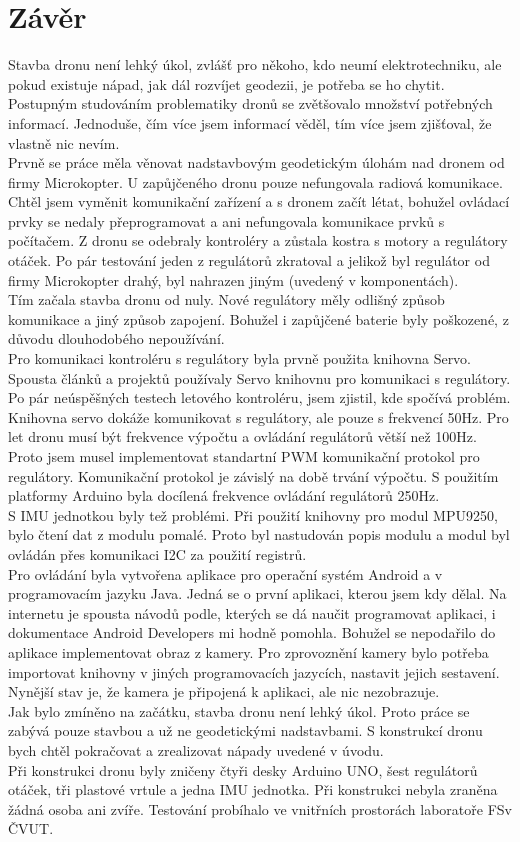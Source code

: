 \chapter{Závěr}
\label{8-zaver}
Stavba dronu není lehký úkol, zvlášť pro někoho, kdo neumí elektrotechniku, ale pokud existuje nápad, jak dál rozvíjet geodezii, je potřeba se ho chytit. Postupným studováním problematiky dronů se zvětšovalo množství potřebných informací. Jednoduše, čím více jsem informací věděl, tím více jsem zjišťoval, že vlastně nic nevím.\\
Prvně se práce měla věnovat nadstavbovým geodetickým úlohám nad dronem od firmy Microkopter. U zapůjčeného dronu pouze nefungovala radiová komunikace. Chtěl jsem vyměnit komunikační zařízení a s dronem začít létat, bohužel ovládací prvky se nedaly přeprogramovat a ani nefungovala komunikace prvků s počítačem. Z dronu se odebraly kontroléry a zůstala kostra s motory a regulátory otáček. Po pár testování jeden z regulátorů zkratoval a jelikož byl regulátor od firmy Microkopter drahý, byl nahrazen jiným (uvedený v komponentách).\\
Tím začala stavba dronu od nuly. Nové regulátory měly odlišný způsob komunikace a jiný způsob zapojení. Bohužel i zapůjčené baterie byly poškozené, z důvodu dlouhodobého nepoužívání.\\
Pro komunikaci kontroléru s regulátory byla prvně použita knihovna Servo. Spousta článků a projektů používaly Servo knihovnu pro komunikaci s regulátory. Po pár neúspěšných testech letového kontroléru, jsem zjistil, kde spočívá problém. Knihovna servo dokáže komunikovat s regulátory, ale pouze s frekvencí 50Hz. Pro let dronu musí být frekvence výpočtu a ovládání regulátorů větší než 100Hz. Proto jsem musel implementovat standartní PWM komunikační protokol pro regulátory. Komunikační protokol je závislý na době trvání výpočtu. S použitím platformy Arduino byla docílená frekvence ovládání regulátorů 250Hz.\\
S IMU jednotkou byly tež problémi. Při použití knihovny pro modul MPU9250, bylo čtení dat z modulu pomalé. Proto byl nastudován popis modulu a modul byl ovládán přes komunikaci I2C za použití registrů.\\
Pro ovládání byla vytvořena aplikace pro operační systém Android a v programovacím jazyku Java. Jedná se o první aplikaci, kterou jsem kdy dělal. Na internetu je spousta návodů podle, kterých se dá naučit programovat aplikaci, i dokumentace Android Developers mi hodně pomohla. Bohužel se nepodařilo do aplikace implementovat obraz z kamery. Pro zprovoznění kamery bylo potřeba importovat knihovny v jiných programovacích jazycích, nastavit jejich sestavení. Nynější stav je, že kamera je připojená k aplikaci, ale nic nezobrazuje.\\
Jak bylo zmíněno na začátku, stavba dronu není lehký úkol. Proto práce se zabývá pouze stavbou a už ne geodetickými nadstavbami. S konstrukcí dronu bych chtěl pokračovat a zrealizovat nápady uvedené v úvodu.\\
Při konstrukci dronu byly zničeny čtyři desky Arduino UNO, šest regulátorů otáček, tři plastové vrtule a jedna IMU jednotka. Při konstrukci nebyla zraněna žádná osoba ani zvíře. Testování probíhalo ve vnitřních prostorách laboratoře FSv ČVUT.\\
